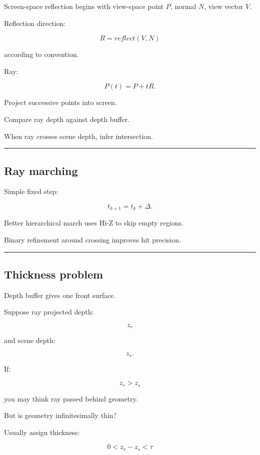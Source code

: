 Screen-space reflection begins with view-space point \(P\), normal \(N\), view vector \(V\).

Reflection direction:

\[
R=
reflect(V,N)
\]

according to convention.

Ray:

\[
P(t)=P+tR.
\]

Project successive points into screen.

Compare ray depth against depth buffer.

When ray crosses scene depth, infer intersection.

\begin{center}\rule{0.5\linewidth}{0.5pt}\end{center}

\subsection{Ray marching}\label{04-visual-computing-ii-ch040-ray-marching}

Simple fixed step:

\[
t_{k+1}=t_k+\Delta.
\]

Better hierarchical march uses Hi-Z to skip empty regions.

Binary refinement around crossing improves hit precision.

\begin{center}\rule{0.5\linewidth}{0.5pt}\end{center}

\subsection{Thickness problem}\label{04-visual-computing-ii-ch040-thickness-problem}

Depth buffer gives one front surface.

Suppose ray projected depth:

\[
z_r
\]

and scene depth:

\[
z_s.
\]

If:

\[
z_r>z_s
\]

you may think ray passed behind geometry.

But is geometry infinitesimally thin?

Usually assign thickness:

\[
0<
z_r-z_s
<
\tau
\]

